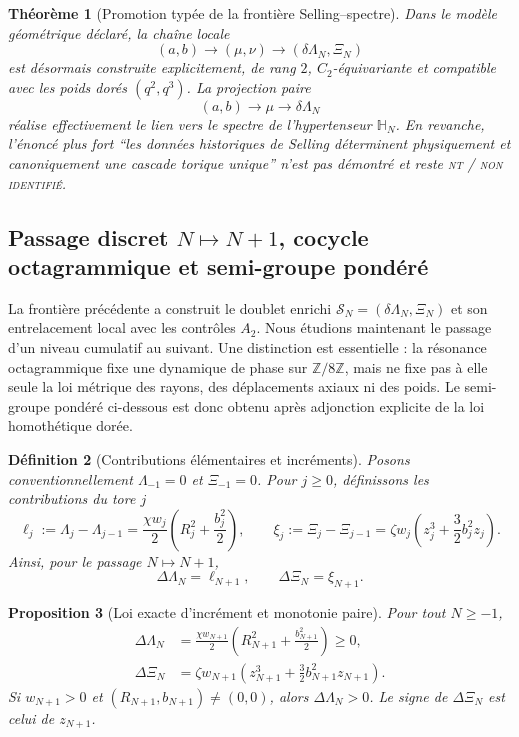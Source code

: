 \documentclass[11pt,a4paper]{article}
\newtheorem{theorem}{Théorème}[section]
\newtheorem{proposition}[theorem]{Proposition}
\newtheorem{definition}[theorem]{Définition}
\newcommand{\Z}{\mathbb Z}
\newcommand{\statusNT}{\textsc{nt / non identifié}}
\begin{document}
\begin{theorem}[Promotion typée de la frontière Selling--spectre]\label{thm:promotion-v6}
Dans le modèle géométrique déclaré, la chaîne locale
\[
 \boxed{
 (a,b)\longrightarrow(\mu,\nu)
 \longrightarrow(\delta\Lambda_N,\Xi_N)}
\]
est désormais construite explicitement, de rang $2$, $C_2$-équivariante et compatible avec les poids dorés $(q^2,q^3)$. La projection paire
\[
 (a,b)\longrightarrow\mu\longrightarrow\delta\Lambda_N
\]
réalise effectivement le lien vers le spectre de l'hypertenseur $\mathbb H_N$. En revanche, l'énoncé plus fort ``les données historiques de Selling déterminent physiquement et canoniquement une cascade torique unique'' n'est pas démontré et reste \statusNT{}.
\end{theorem}

\subsection{Passage discret $N\mapsto N+1$, cocycle octagrammique et semi-groupe pondéré}\label{subsec:discrete-octagram-semigroup}

La frontière précédente a construit le doublet enrichi
\(
 \mathscr S_N=(\delta\Lambda_N,\Xi_N)
\)
et son entrelacement local avec les contrôles $A_2$. Nous étudions maintenant le passage d'un niveau cumulatif au suivant. Une distinction est essentielle : la résonance octagrammique fixe une dynamique de phase sur $\Z/8\Z$, mais ne fixe pas à elle seule la loi métrique des rayons, des déplacements axiaux ni des poids. Le semi-groupe pondéré ci-dessous est donc obtenu après adjonction explicite de la loi homothétique dorée.

\begin{definition}[Contributions élémentaires et incréments]
Posons conventionnellement $\Lambda_{-1}=0$ et $\Xi_{-1}=0$. Pour $j\ge0$, définissons les contributions du tore $j$
\begin{equation}\label{eq:elementary-lambda-xi}
 \ell_j:=\Lambda_j-\Lambda_{j-1}
 =\frac{\chi w_j}{2}\left(R_j^2+\frac{b_j^2}{2}\right),
 \qquad
 \xi_j:=\Xi_j-\Xi_{j-1}
 =\zeta w_j\left(z_j^3+\frac32b_j^2z_j\right).
\end{equation}
Ainsi, pour le passage $N\mapsto N+1$,
\begin{equation}\label{eq:Delta-Lambda-Xi}
 \boxed{\Delta\Lambda_N=\ell_{N+1},\qquad
 \Delta\Xi_N=\xi_{N+1}.}
\end{equation}
\end{definition}

\begin{proposition}[Loi exacte d'incrément et monotonie paire]\label{prop:exact-discrete-increments}
Pour tout $N\ge-1$,
\begin{align}
 \Delta\Lambda_N
 &=\frac{\chi w_{N+1}}{2}
 \left(R_{N+1}^2+\frac{b_{N+1}^2}{2}\right)\ge0,\label{eq:DeltaLambda-exact}\\
 \Delta\Xi_N
 &=\zeta w_{N+1}
 \left(z_{N+1}^3+\frac32b_{N+1}^2z_{N+1}\right).\label{eq:DeltaXi-exact}
\end{align}
Si $w_{N+1}>0$ et $(R_{N+1},b_{N+1})\ne(0,0)$, alors $\Delta\Lambda_N>0$. Le signe de $\Delta\Xi_N$ est celui de $z_{N+1}$.
\end{proposition}
\end{document}
